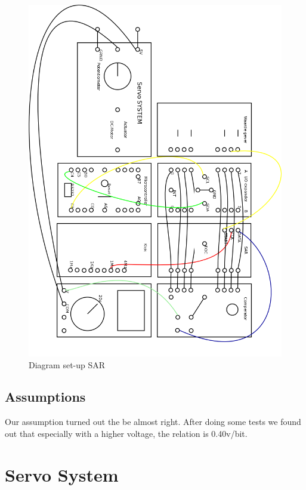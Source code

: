 \documentclass[a4paper, 12pt, titlepage]{article}
\begin{document}
\newpage
\addtolength{\oddsidemargin}{-1in}
\addtolength{\evensidemargin}{-1in}
\begin{figure}[H]
\caption{Diagram set-up SAR}
\includegraphics[scale=0.61]{SAR.png}
\end{figure}
\addtolength{\oddsidemargin}{+1in}
\addtolength{\evensidemargin}{+1in}
\newpage
\subsection{Assumptions} %
Our assumption turned out the be almost right. After doing some tests we found out that especially with a higher voltage, the relation is 0.40v/bit.



\newpage
\section{Servo System} %
\end{document}
